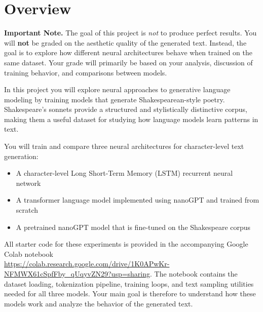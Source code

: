 \newif\ifshowsolutions
\showsolutionstrue




\pagestyle{fancy}

\section{Overview}

\noindent
\textbf{Important Note.} The goal of this project is \emph{not} to produce perfect results.
You will \textbf{not} be graded on the aesthetic quality of the generated text.
Instead, the goal is to explore how different neural architectures behave when
trained on the same dataset. Your grade will primarily be based on your analysis,
discussion of training behavior, and comparisons between models.

\medskip

In this project you will explore neural approaches to generative language modeling
by training models that generate Shakespearean-style poetry. Shakespeare's sonnets
provide a structured and stylistically distinctive corpus, making them a useful
dataset for studying how language models learn patterns in text.

You will train and compare three neural architectures for character-level text generation:

\begin{itemize}
\item A character-level Long Short-Term Memory (LSTM) recurrent neural network
\item A transformer language model implemented using nanoGPT and trained from scratch
\item A pretrained nanoGPT model that is fine-tuned on the Shakespeare corpus
\end{itemize}

All starter code for these experiments is provided in the accompanying Google
Colab notebook \\ \url{https://colab.research.google.com/drive/1K0APwKr-NFMWX61cSpfFby_qUqyvZN29?usp=sharing}. The notebook contains the dataset loading, tokenization pipeline,
training loops, and text sampling utilities needed for all three models. Your
main goal is therefore to understand how these models work and analyze the
behavior of the generated text.

